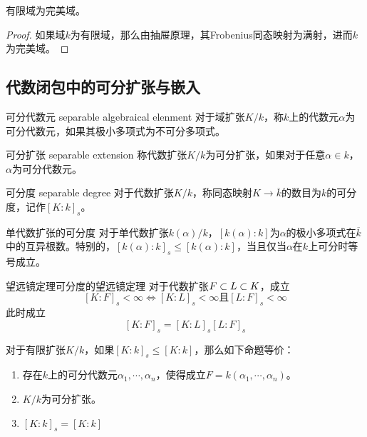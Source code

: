 \begin{corollary}
	有限域为完美域。
\end{corollary}

\begin{proof}
	如果域$k$为有限域，那么由抽屉原理，其Frobenius同态映射为满射，进而$k$为完美域。
\end{proof}

\subsection{代数闭包中的可分扩张与嵌入}

\begin{definition}{可分代数元 separable algebraical elenment}
	对于域扩张$K/k$，称$k$上的代数元$\alpha$为可分代数元，如果其极小多项式为不可分多项式。
\end{definition}

\begin{definition}{可分扩张 separable extension}
	称代数扩张$K/k$为可分扩张，如果对于任意$\alpha\in k$，$\alpha$为可分代数元。
\end{definition}

\begin{definition}{可分度 separable degree}
	对于代数扩张$K/k$，称同态映射$K\to \overline{k}$的数目为$k$的可分度，记作$[K:k]_s$。
\end{definition}

\begin{lemma}{}{单代数扩张的可分度}
	对于单代数扩张$k(\alpha)/k$，$[k(\alpha):k]$为$\alpha$的极小多项式在$\overline{k}$中的互异根数。特别的，$[k(\alpha):k]_s\le [k(\alpha):k]$，当且仅当$\alpha$在$k$上可分时等号成立。
\end{lemma}

\begin{proposition}{望远镜定理}{可分度的望远镜定理}
	对于代数扩张$F\subset L\subset K$，成立
	$$
	[K:F]_s<\infty\iff [K:L]_s<\infty\text{且}[L:F]_s<\infty
	$$
	此时成立
	$$
	[K:F]_s=[K:L]_s[L:F]_s
	$$
\end{proposition}

\begin{proposition}
	对于有限扩张$K/k$，如果$[K:k]_s\le [K:k]$，那么如下命题等价：
	\begin{enumerate}
		\item 存在$k$上的可分代数元$\alpha_1,\cdots,\alpha_n$，使得成立$F=k(\alpha_1,\cdots,\alpha_n)$。
		\item $K/k$为可分扩张。
		\item $[K:k]_s=[K:k]$
	\end{enumerate}
\end{proposition}

